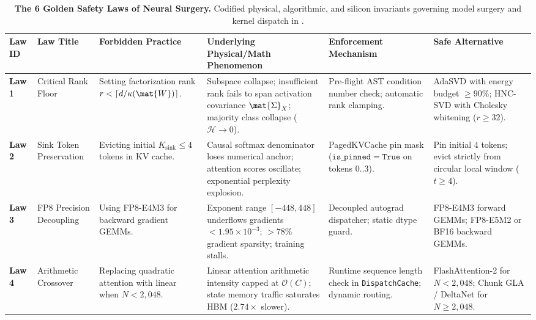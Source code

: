 \begin{table}[t]
\centering
\scriptsize
\caption[The 6 Golden Safety Laws of Neural Surgery]{\textbf{The 6 Golden Safety Laws of Neural Surgery.} Codified physical, algorithmic, and silicon invariants governing model surgery and kernel dispatch in \neuralops{}.}
\label{tab:six_golden_laws}
\setlength{\tabcolsep}{4.0pt}
\renewcommand{\arraystretch}{1.25}
\begin{tabularx}{\textwidth}{@{}l >{\raggedright\arraybackslash}p{2.2cm} >{\raggedright\arraybackslash}p{2.6cm} >{\raggedright\arraybackslash}p{3.4cm} >{\raggedright\arraybackslash}p{2.8cm} >{\raggedright\arraybackslash}X@{}}
\toprule
\textbf{Law ID} & \textbf{Law Title} & \textbf{Forbidden Practice} & \textbf{Underlying Physical/Math Phenomenon} & \textbf{Enforcement Mechanism} & \textbf{Safe Alternative} \\
\midrule
\textbf{Law 1} & Critical Rank Floor & Setting factorization rank $r < \lceil d / \kappa(\mat{W}) \rceil$. & Subspace collapse; insufficient rank fails to span activation covariance $\mat{\Sigma}_X$; majority class collapse ($\mathcal{H} \to 0$). & Pre-flight AST condition number check; automatic rank clamping. & AdaSVD with energy budget $\ge 90\%$; HNC-SVD with Cholesky whitening ($r \ge 32$). \\
\midrule
\textbf{Law 2} & Sink Token Preservation & Evicting initial $K_{\text{sink}} \le 4$ tokens in KV cache. & Causal softmax denominator loses numerical anchor; attention scores oscillate; exponential perplexity explosion. & PagedKVCache pin mask ($\mathtt{is\_pinned=True}$ on tokens $0..3$). & Pin initial 4 tokens; evict strictly from circular local window ($t \ge 4$). \\
\midrule
\textbf{Law 3} & FP8 Precision Decoupling & Using FP8-E4M3 for backward gradient GEMMs. & Exponent range $[-448, 448]$ underflows gradients $< 1.95 \times 10^{-3}$; $>78\%$ gradient sparsity; training stalls. & Decoupled autograd dispatcher; static dtype guard. & FP8-E4M3 forward GEMMs; FP8-E5M2 or BF16 backward GEMMs. \\
\midrule
\textbf{Law 4} & Arithmetic Crossover & Replacing quadratic attention with linear when $N < 2{,}048$. & Linear attention arithmetic intensity capped at $\mathcal{O}(C)$; state memory traffic saturates HBM ($2.74\times$ slower). & Runtime sequence length check in \texttt{DispatchCache}; dynamic routing. & FlashAttention-2 for $N < 2{,}048$; Chunk GLA / DeltaNet for $N \ge 2{,}048$. \\

\end{tabularx}
\end{table}
